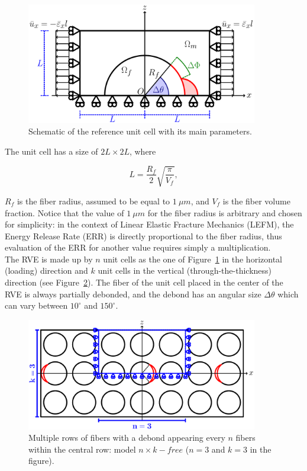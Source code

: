 \begin{figure}[!h]
    \includegraphics[width=0.9\textwidth]{paperB/RUC.pdf}
    \caption{Schematic of the reference unit cell with its main parameters.}\label{chap3:paperB:fig:modelschem}
\end{figure}

The unit cell has a size of $2L\times2L$, where

\begin{equation}\label{chap3:paperB:eq:LVf}
L=\frac{R_{f}}{2}\sqrt{\frac{\pi}{V_{f}}},
\end{equation}

$R_{f}$ is the fiber radius, assumed to be equal to $1\ \mu m$, and $V_{f}$ is the fiber volume fraction. Notice that the value of $1\ \mu m$ for the fiber radius is arbitrary and chosen for simplicity: in the context of Linear Elastic Fracture Mechanics (LEFM), the Energy Release Rate (ERR) is directly proportional to the fiber radius, thus evaluation of the ERR for another value requires simply a multiplication.\\
The RVE is made up by $n$ unit cells as the one of Figure~\ref{chap3:paperB:fig:modelschem} in the horizontal (loading) direction and $k$ unit cells in the vertical (through-the-thickness) direction (see Figure~\ref{chap3:paperB:fig:thickply}). The fiber of the unit cell placed in the center of the RVE is always partially debonded, and the debond has an angular size $\Delta\theta$ which can vary between $10^{\circ}$ and $150^{\circ}$.

\begin{figure}[!h]
    \includegraphics[width=0.9\textwidth]{paperB/thickPly.pdf}
    \caption{Multiple rows of fibers with a debond appearing every $n$ fibers within the central row: model $n\times k-free$ ($n=3$ and $k=3$ in the figure).}\label{chap3:paperB:fig:thickply}
\end{figure}

